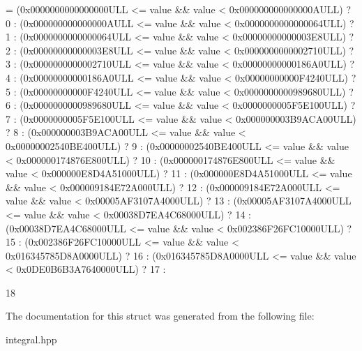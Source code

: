 \begin{DoxyCode}
= (0x0000000000000000ULL <= value && value < 0x000000000000000AULL) ? 0 :  
                                       (0x000000000000000AULL <= value && value < 0x0000000000000064ULL) ? 
      1 :  
                                       (0x0000000000000064ULL <= value && value < 0x00000000000003E8ULL) ? 
      2 :  
                                       (0x00000000000003E8ULL <= value && value < 0x0000000000002710ULL) ? 
      3 :  
                                       (0x0000000000002710ULL <= value && value < 0x00000000000186A0ULL) ? 
      4 :  
                                       (0x00000000000186A0ULL <= value && value < 0x00000000000F4240ULL) ? 
      5 :  
                                       (0x00000000000F4240ULL <= value && value < 0x0000000000989680ULL) ? 
      6 :  
                                       (0x0000000000989680ULL <= value && value < 0x0000000005F5E100ULL) ? 
      7 :  
                                       (0x0000000005F5E100ULL <= value && value < 0x000000003B9ACA00ULL) ? 
      8 :  
                                       (0x000000003B9ACA00ULL <= value && value < 0x00000002540BE400ULL) ? 
      9 :  
                                       (0x00000002540BE400ULL <= value && value < 0x000000174876E800ULL) ? 
      10 : 
                                       (0x000000174876E800ULL <= value && value < 0x000000E8D4A51000ULL) ? 
      11 : 
                                       (0x000000E8D4A51000ULL <= value && value < 0x000009184E72A000ULL) ? 
      12 : 
                                       (0x000009184E72A000ULL <= value && value < 0x00005AF3107A4000ULL) ? 
      13 : 
                                       (0x00005AF3107A4000ULL <= value && value < 0x00038D7EA4C68000ULL) ? 
      14 : 
                                       (0x00038D7EA4C68000ULL <= value && value < 0x002386F26FC10000ULL) ? 
      15 : 
                                       (0x002386F26FC10000ULL <= value && value < 0x016345785D8A0000ULL) ? 
      16 : 
                                       (0x016345785D8A0000ULL <= value && value < 0x0DE0B6B3A7640000ULL) ? 
      17 : 
                                                                                                           
      18
\end{DoxyCode}


The documentation for this struct was generated from the following file\+:\begin{DoxyCompactItemize}
\item 
integral.\+hpp\end{DoxyCompactItemize}

